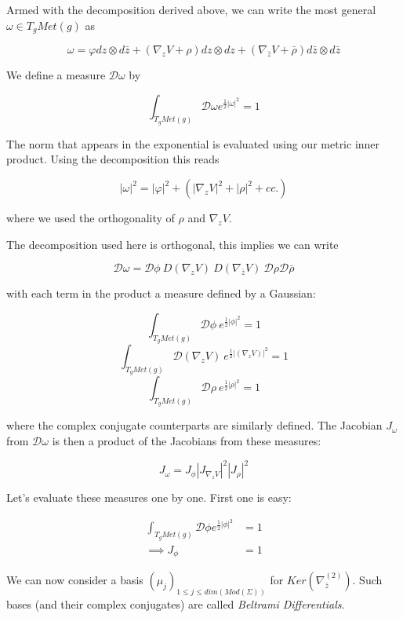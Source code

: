 Armed with the decomposition derived above, we can write the most general $\omega \in T_gMet(g)$ as

\begin{equation}
    \omega = \varphi dz \otimes d\bar z + (\nabla_z V + \rho) dz \otimes d z + (\nabla_{\bar z} V + \bar \rho) d\bar z \otimes d \bar z
\end{equation}

We define a measure $\mathcal D \omega$ by

\begin{equation}
    \int_{T_g Met(g)} \mathcal D \omega e^{\frac12 |\omega|^2} = 1
\end{equation}


The norm that appears in the exponential is evaluated using our metric inner product. Using the decomposition this reads

\begin{equation}
    |\omega|^2 = |\varphi|^2 + (|\nabla_z V|^2 + |\rho|^2 + cc.)
\end{equation}

where we used the orthogonality of $\rho$ and $\nabla_z V$.


The decomposition used here is orthogonal, this implies we can write

\begin{equation}
    \mathcal D \omega = \mathcal D \phi \mathcal
    ~ D (\nabla_z V)\mathcal
    ~ D (\nabla_{\bar z} V)
    ~ \mathcal D \rho \mathcal D \bar \rho
\end{equation}

with each term in the product a measure defined by a Gaussian:


\begin{equation}
     \int_{T_g Met(g)} \mathcal D \phi ~ e^{\frac12 |\phi|^2} = 1
\end{equation}
\begin{equation}
     \int_{T_g Met(g)} \mathcal D (\nabla_z V) ~ e^{\frac12 |(\nabla_z V)|^2} = 1
\end{equation}
\begin{equation}
     \int_{T_g Met(g)} \mathcal D \rho ~ e^{\frac12 |\rho|^2} = 1
\end{equation}


where the complex conjugate counterparts are similarly defined. The Jacobian $J_\omega$ from $\mathcal D \omega$ is then a product of the Jacobians from these measures:

\begin{equation}
    J_\omega = J_\phi |J_{\nabla_z V}|^2 |J_\rho|^2
\end{equation}



Let's evaluate these measures one by one. First one is easy:

\begin{align}
     \int_{T_g Met(g)} \mathcal D \phi e^{\frac12 |\phi|^2} &= 1 \\
        \implies J_\phi &= 1
\end{align}


We can now consider a basis $(\mu_j)_{1 \le j \le dim(Mod(\Sigma))}$ for $Ker(\nabla^{(2)}_{\bar z})$. Such bases (and their complex conjugates) are called \textit{Beltrami Differentials}. 
